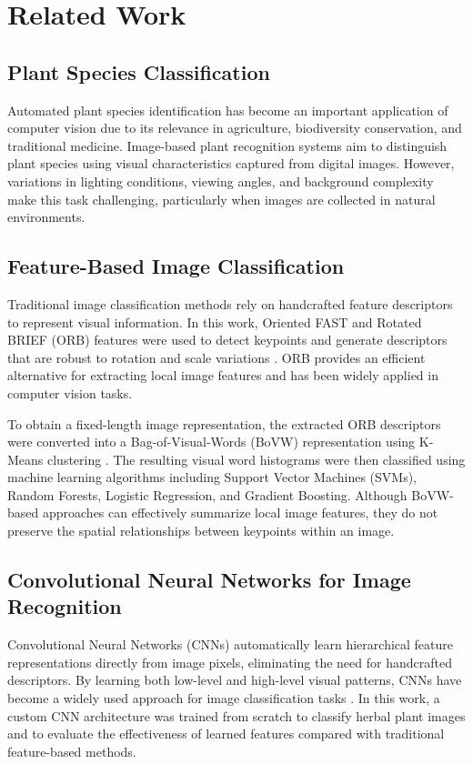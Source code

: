 \section{Related Work}

\subsection{Plant Species Classification}

Automated plant species identification has become an important application of computer vision due to its relevance in agriculture, biodiversity conservation, and traditional medicine. Image-based plant recognition systems aim to distinguish plant species using visual characteristics captured from digital images. However, variations in lighting conditions, viewing angles, and background complexity make this task challenging, particularly when images are collected in natural environments.

\subsection{Feature-Based Image Classification}

Traditional image classification methods rely on handcrafted feature descriptors to represent visual information. In this work, Oriented FAST and Rotated BRIEF (ORB) features were used to detect keypoints and generate descriptors that are robust to rotation and scale variations \cite{orb}. ORB provides an efficient alternative for extracting local image features and has been widely applied in computer vision tasks.

To obtain a fixed-length image representation, the extracted ORB descriptors were converted into a Bag-of-Visual-Words (BoVW) representation using K-Means clustering \cite{bovw}. The resulting visual word histograms were then classified using machine learning algorithms including Support Vector Machines (SVMs), Random Forests, Logistic Regression, and Gradient Boosting. Although BoVW-based approaches can effectively summarize local image features, they do not preserve the spatial relationships between keypoints within an image.

\subsection{Convolutional Neural Networks for Image Recognition}

Convolutional Neural Networks (CNNs) automatically learn hierarchical feature representations directly from image pixels, eliminating the need for handcrafted descriptors. By learning both low-level and high-level visual patterns, CNNs have become a widely used approach for image classification tasks \cite{cnn_intro}. In this work, a custom CNN architecture was trained from scratch to classify herbal plant images and to evaluate the effectiveness of learned features compared with traditional feature-based methods.

